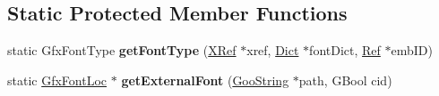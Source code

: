 \subsection*{Static Protected Member Functions}
\begin{DoxyCompactItemize}
\item 
\mbox{\label{class_gfx_font_acfe71a57d15274a94172611bcc210847}} 
static Gfx\+Font\+Type {\bfseries get\+Font\+Type} (\hyperlink{class_x_ref}{X\+Ref} $\ast$xref, \hyperlink{class_dict}{Dict} $\ast$font\+Dict, \hyperlink{struct_ref}{Ref} $\ast$emb\+ID)
\item 
\mbox{\label{class_gfx_font_abd782a6a6bacd1ea28d323c10e9b88c1}} 
static \hyperlink{class_gfx_font_loc}{Gfx\+Font\+Loc} $\ast$ {\bfseries get\+External\+Font} (\hyperlink{class_goo_string}{Goo\+String} $\ast$path, G\+Bool cid)
\end{DoxyCompactItemize}
